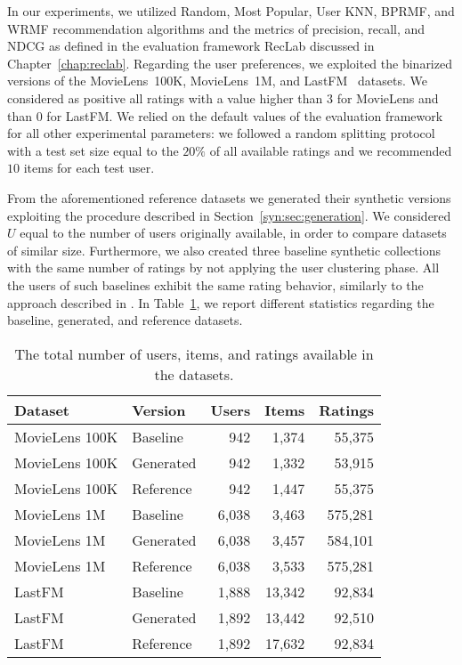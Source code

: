 In our experiments, we utilized Random, Most Popular, User KNN, BPRMF, and WRMF recommendation algorithms and the metrics of precision, recall, and NDCG as defined in the evaluation framework RecLab discussed in Chapter~\ref{chap:reclab}. Regarding the user preferences, we exploited the binarized versions of the MovieLens~100K, MovieLens~1M, and LastFM~\cite{Cantador2011} datasets. We considered as positive all ratings with a value higher than $3$ for MovieLens and than $0$ for LastFM. We relied on the default values of the evaluation framework for all other experimental parameters: we followed a random splitting protocol with a test set size equal to the $20\%$ of all available ratings and we recommended $10$ items for each test user.

From the aforementioned reference datasets we generated their synthetic versions exploiting the procedure described in Section~\ref{syn:sec:generation}. We considered $U$ equal to the number of users originally available, in order to compare datasets of similar size. Furthermore, we also created three baseline synthetic collections with the same number of ratings by not applying the user clustering phase. All the users of such baselines exhibit the same rating behavior, similarly to the approach described in \cite{CarmenRodriguez-Hernandez2017}. In Table~\ref{syn:tab:stats}, we report different statistics regarding the baseline, generated, and reference datasets.

\begin{table}
\centering
\begin{tabular}{@{}llrrr@{}}
\toprule
Dataset & Version & Users & Items & Ratings \\ \midrule
MovieLens 100K & Baseline & 942 & 1,374 & 55,375 \\
MovieLens 100K & Generated & 942 & 1,332 & 53,915 \\
MovieLens 100K & Reference & 942 & 1,447 & 55,375 \\ \midrule
MovieLens 1M & Baseline & 6,038 & 3,463 & 575,281 \\
MovieLens 1M & Generated & 6,038 & 3,457 & 584,101 \\
MovieLens 1M & Reference & 6,038 & 3,533 & 575,281 \\ \midrule
LastFM & Baseline & 1,888 & 13,342 & 92,834 \\
LastFM & Generated & 1,892 & 13,442 & 92,510 \\
LastFM & Reference & 1,892 & 17,632 & 92,834 \\ \bottomrule
\end{tabular}
\caption[Statistics about the synthetic datasets]{The total number of users, items, and ratings available in the datasets.}
\label{syn:tab:stats}
\end{table}

